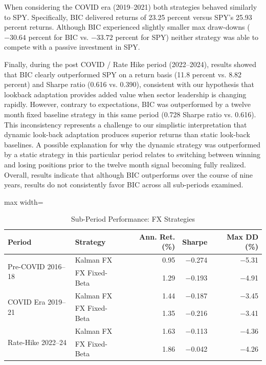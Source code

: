 \documentclass[12pt]{article}
\begin{document}
When considering the COVID era (2019--2021) both strategies behaved similarly to SPY. Specifically, BIC delivered returns of 23.25 percent versus SPY's 25.93 percent returns. Although BIC experienced slightly smaller max draw-downs ($-30.64$ percent for BIC vs. $-33.72$ percent for SPY) neither strategy was able to compete with a passive investment in SPY.

Finally, during the post COVID / Rate Hike period (2022--2024), results showed that BIC clearly outperformed SPY on a return basis (11.8 percent vs. 8.82 percent) and Sharpe ratio (0.616 vs. 0.390), consistent with our hypothesis that lookback adaptation provides added value when sector leadership is changing rapidly. However, contrary to expectations, BIC was outperformed by a twelve month fixed baseline strategy in this same period (0.728 Sharpe ratio vs. 0.616). This inconsistency represents a challenge to our simplistic interpretation that dynamic look-back adaptation produces superior returns than static look-back baselines. A possible explanation for why the dynamic strategy was outperformed by a static strategy in this particular period relates to switching between winning and losing positions prior to the twelve month signal becoming fully realized. Overall, results indicate that although BIC outperforms over the course of nine years, results do not consistently favor BIC across all sub-periods examined.

\begin{table}[H]
\centering
\caption{Sub-Period Performance: FX Strategies}
\label{tab:subperiod_fx}
\begingroup
\singlespacing
\footnotesize
\setlength{\tabcolsep}{4pt}
\renewcommand{\arraystretch}{1.12}
\begin{adjustbox}{max width=\textwidth}
\begin{tabular}{llrrr}
\toprule
\textbf{Period} & \textbf{Strategy} & \textbf{Ann. Ret. (\%)} & \textbf{Sharpe} & \textbf{Max DD (\%)} \\
\midrule
\multirow{2}{*}{Pre-COVID 2016--18}
 & Kalman FX        &  0.95 & $-$0.274 & $-$5.31 \\
 & FX Fixed-Beta    &  1.29 & $-$0.193 & $-$4.91 \\
\midrule
\multirow{2}{*}{COVID Era 2019--21}
 & Kalman FX        &  1.44 & $-$0.187 & $-$3.45 \\
 & FX Fixed-Beta    &  1.35 & $-$0.216 & $-$3.41 \\
\midrule
\multirow{2}{*}{Rate-Hike 2022--24}
 & Kalman FX        &  1.63 & $-$0.113 & $-$4.36 \\
 & FX Fixed-Beta    &  1.86 & $-$0.042 & $-$4.26 \\
\bottomrule
\end{tabular}
\end{adjustbox}
\endgroup
\end{table}
\end{document}
